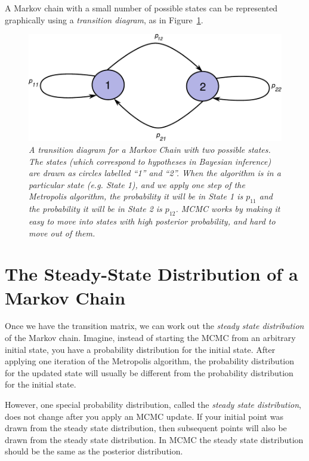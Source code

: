 A Markov chain with a small number of possible states can be represented
graphically using a {\it transition diagram}, as in
Figure~\ref{fig:transitions}.

\begin{figure}[!ht]
\begin{center}
\includegraphics[scale=0.65]{Figures/transitions.pdf}
\caption{\it A transition diagram for a Markov Chain with two possible states.
The states (which correspond to hypotheses in Bayesian inference) are drawn
as circles labelled ``1'' and ``2''. When the algorithm is in a particular state
(e.g. State 1), and we apply one step of the Metropolis algorithm,
the probability it will be in State 1 is $p_{11}$ and the probability it
will be in State 2 is $p_{12}$.
MCMC works by making it easy to move into states with high
posterior probability, and hard to move out of them.
\label{fig:transitions}}
\end{center}
\end{figure}

\section{The Steady-State Distribution of a Markov Chain}
Once we have the transition matrix, we can work out the {\it steady state
distribution} of the Markov chain. Imagine, instead of starting the MCMC
from an arbitrary initial state, you have a probability distribution for the
initial state. After applying one iteration of the Metropolis algorithm, the
probability distribution for the updated state will usually be different from
the probability distribution for the initial state.

However, one special probability distribution, called the {\it steady state
distribution}, does not change after you apply an MCMC update. If your initial
point was drawn from the steady state distribution, then subsequent points will
also be drawn from the steady state distribution. In MCMC the steady state
distribution should be the same as the posterior distribution.

